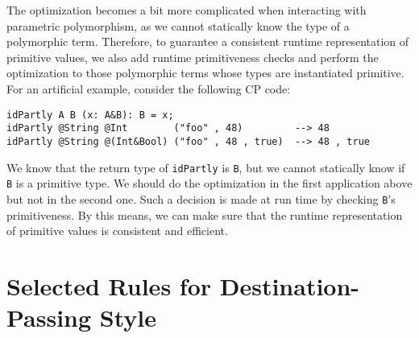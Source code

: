 The optimization becomes a bit more complicated when interacting with parametric
polymorphism, as we cannot statically know the type of a polymorphic term.
Therefore, to guarantee a consistent runtime representation of primitive values,
we also add runtime primitiveness checks and perform the optimization to those
polymorphic terms whose types are instantiated primitive. For an artificial
example, consider the following CP code:
\begin{lstlisting}
idPartly A B (x: A&B): B = x;
idPartly @String @Int        ("foo" , 48)         --> 48
idPartly @String @(Int&Bool) ("foo" , 48 , true)  --> 48 , true
\end{lstlisting}
We know that the return type of \lstinline{idPartly} is \lstinline{B}, but we
cannot statically know if \lstinline{B} is a primitive type. We should do the
optimization in the first application above but not in the second one. Such a
decision is made at run time by checking \lstinline{B}'s primitiveness. By this
means, we can make sure that the runtime representation of primitive values is
consistent and efficient.

\section{Selected Rules for Destination-Passing Style} \label{sec:dst}

\newcommand{\compilation}{$\Gamma  \ottsym{;}  \ottnt{dst}  \vdash  \ottnt{e} \, \Leftrightarrow \, \ottnt{A}  \, \rightsquigarrow \,  \texttt{J}  \; | \;  \ottmv{z}$}
\newcommand{\application}{$\Gamma  \ottsym{;}  \ottnt{dst}  \vdash  \ottmv{x}  \ottsym{:}  \ottnt{A}  \, \bullet \,  \ottmv{y}  \ottsym{:}  \ottnt{B}  \, \rightsquigarrow \,  \texttt{J}  \; | \;  \ottmv{z}  \ottsym{:}  \ottnt{C}$}

